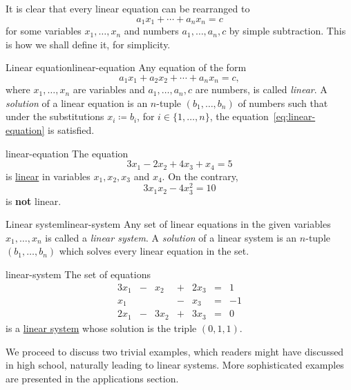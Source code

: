 It is clear that every linear equation can be rearranged to
\[
 a_1 x_1 + \cdots + a_n x_n = c
\]
for some variables $x_1,\ldots,x_n$ and numbers $a_1,\ldots,a_n,c$ by simple
subtraction. This is how we shall define it, for simplicity.

\begin{definition}{Linear equation}{linear-equation}
 Any equation of the form
 \begin{equation}
  \label{eq:linear-equation}
  a_1x_1 + a_2x_2 + \cdots + a_n x_n = c,
 \end{equation}
 where $x_1,\ldots,x_n$ are variables and $a_1,\ldots,a_n,c$ are numbers, is
 called \emph{linear}. A \emph{solution} of a linear equation is an $n$-tuple
 $(b_1,\ldots,b_n)$ of numbers such that under the substitutions $x_i \coloneqq
 b_i$, for $i \in \{1,\ldots,n\}$, the equation~\eqref{eq:linear-equation} is
 satisfied.
\end{definition}

\begin{example}{}{linear-equation}
 The equation
 \[
  3x_1 - 2x_2 + 4x_3 + x_4 = 5
 \]
 is \hyperref[def:linear-equation]{linear} in variables $x_1,x_2,x_3$ and $x_4$.
 On the contrary,
 \[
  3x_1x_2 - 4x_3^2 = 10
 \]
 is \textbf{not} linear.
\end{example}

\begin{definition}{Linear system}{linear-system}
 Any set of linear equations in the given variables $x_1,\ldots,x_n$ is called a
 \emph{linear system}. A \emph{solution} of a linear system is an $n$-tuple
 $(b_1,\ldots,b_n)$ which solves every linear equation in the set.
\end{definition}

\begin{example}{}{linear-system}
 The set of equations
 \[
  \begin{array}{rcrcrcr}
   3x_1 & - & x_2 & + & 2x_3 &= &1\\
   x_1 & & & - & x_3 &= &-1 \\
   2x_1 & - & 3x_2 & + & 3x_3 & = & 0
  \end{array}
 \]
 is a \hyperref[def:linear-system]{linear system} whose solution is the triple
 $(0,1,1)$.
\end{example}

We proceed to discuss two trivial examples, which readers might have discussed
in high school, naturally leading to linear systems. More sophisticated examples
are presented in the applications section.


